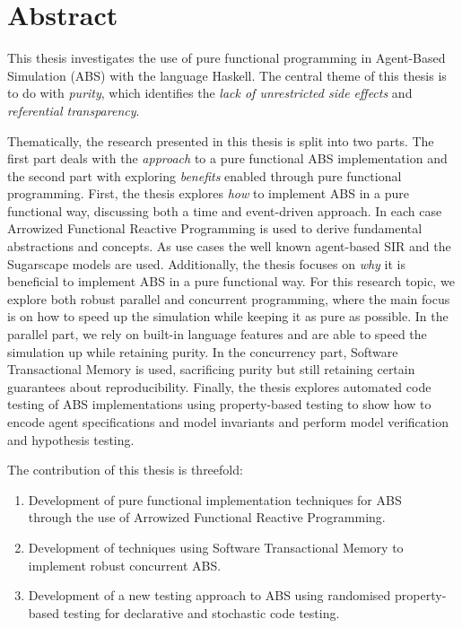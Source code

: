 \section*{Abstract}
This thesis investigates the use of pure functional programming in Agent-Based Simulation (ABS) with the language Haskell. The central theme of this thesis is to do with \textit{purity}, which identifies the \textit{lack of unrestricted side effects} and \textit{referential transparency}.

Thematically, the research presented in this thesis is split into two parts. The first part deals with the \textit{approach} to a pure functional ABS implementation and the second part with exploring \textit{benefits} enabled through pure functional programming.
First, the thesis explores \textit{how} to implement ABS in a pure functional way, discussing both a time and event-driven approach. In each case Arrowized Functional Reactive Programming is used to derive fundamental abstractions and concepts. As use cases the well known agent-based SIR and the Sugarscape models are used. Additionally, the thesis focuses on \textit{why} it is beneficial to implement ABS in a pure functional way. For this research topic, we explore both robust parallel and concurrent programming, where the main focus is on how to speed up the simulation while keeping it as pure as possible. In the parallel part, we rely on built-in language features and are able to speed the simulation up while retaining purity. In the concurrency part, Software Transactional Memory is used, sacrificing purity but still retaining certain guarantees about reproducibility. Finally, the thesis explores automated code testing of ABS implementations using property-based testing to show how to encode agent specifications and model invariants and perform model verification and hypothesis testing.

The contribution of this thesis is threefold:
\begin{enumerate}
	\item Development of pure functional implementation techniques for ABS \\ through the use of Arrowized Functional Reactive Programming.
	\item Development of techniques using Software Transactional Memory to implement robust concurrent ABS.
	\item Development of a new testing approach to ABS using randomised property-based testing for declarative and stochastic code testing.
\end{enumerate}

